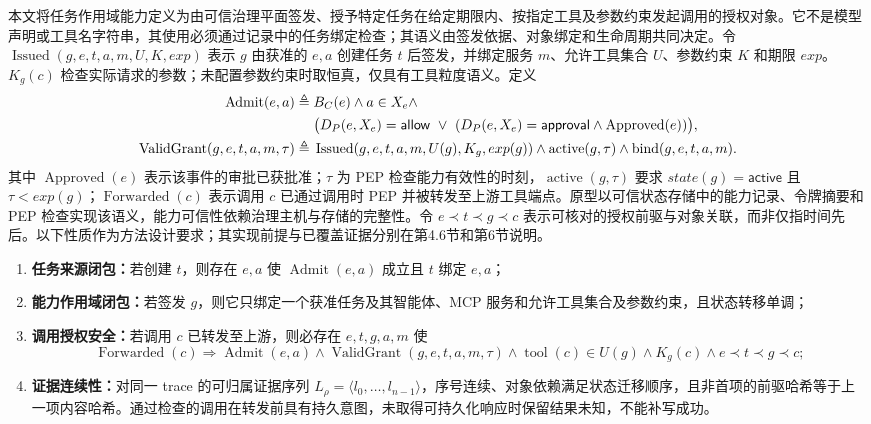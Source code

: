 本文将任务作用域能力定义为由可信治理平面签发、授予特定任务在给定期限内、按指定工具及参数约束发起调用的授权对象。它不是模型声明或工具名字符串，其使用必须通过记录中的任务绑定检查；其语义由签发依据、对象绑定和生命周期共同决定。令 $\operatorname{Issued}(g,e,t,a,m,U,K,exp)$ 表示 $g$ 由获准的 $e,a$ 创建任务 $t$ 后签发，并绑定服务 $m$、允许工具集合 $U$、参数约束 $K$ 和期限 $exp$。$K_g(c)$ 检查实际请求的参数；未配置参数约束时取恒真，仅具有工具粒度语义。定义
\begin{align}
\operatorname{Admit}(e,a) \triangleq {}& B_C(e)\land a\in X_e\land\\
&\bigl(D_P(e,X_e)=\mathsf{allow}\ \lor\
(D_P(e,X_e)=\mathsf{approval}\land\operatorname{Approved}(e))\bigr),\notag \\
\operatorname{ValidGrant}(g,e,t,a,m,\tau) \triangleq {}&
\operatorname{Issued}(g,e,t,a,m,U(g),K_g,exp(g))\land
\operatorname{active}(g,\tau)\land
\operatorname{bind}(g,e,t,a,m).
\label{eq:predicates-v11}
\end{align}
其中 $\operatorname{Approved}(e)$ 表示该事件的审批已获批准；$\tau$ 为 PEP 检查能力有效性的时刻，$\operatorname{active}(g,\tau)$ 要求 $state(g)=\mathsf{active}$ 且 $\tau<exp(g)$；$\operatorname{Forwarded}(c)$ 表示调用 $c$ 已通过调用时 PEP 并被转发至上游工具端点。原型以可信状态存储中的能力记录、令牌摘要和 PEP 检查实现该语义，能力可信性依赖治理主机与存储的完整性。令 $e\prec t\prec g\prec c$ 表示可核对的授权前驱与对象关联，而非仅指时间先后。以下性质作为方法设计要求；其实现前提与已覆盖证据分别在第4.6节和第6节说明。

\begin{enumerate}[label=I\arabic*.]
  \item \textbf{任务来源闭包：}若创建 $t$，则存在 $e,a$ 使 $\operatorname{Admit}(e,a)$ 成立且 $t$ 绑定 $e,a$；
  \item \textbf{能力作用域闭包：}若签发 $g$，则它只绑定一个获准任务及其智能体、MCP 服务和允许工具集合及参数约束，且状态转移单调；
  \item \textbf{调用授权安全：}若调用 $c$ 已转发至上游，则必存在 $e,t,g,a,m$ 使
  \begin{equation}
  \operatorname{Forwarded}(c)\Rightarrow
  \operatorname{Admit}(e,a)\land
  \operatorname{ValidGrant}(g,e,t,a,m,\tau)\land
  \operatorname{tool}(c)\in U(g)\land K_g(c)\land e\prec t\prec g\prec c;
  \label{eq:end-to-end-safety-v11}
  \end{equation}
  \item \textbf{证据连续性：}对同一 trace 的可归属证据序列 $L_\rho=\langle l_0,\ldots,l_{n-1}\rangle$，序号连续、对象依赖满足状态迁移顺序，且非首项的前驱哈希等于上一项内容哈希。通过检查的调用在转发前具有持久意图，未取得可持久化响应时保留结果未知，不能补写成功。
\end{enumerate}

